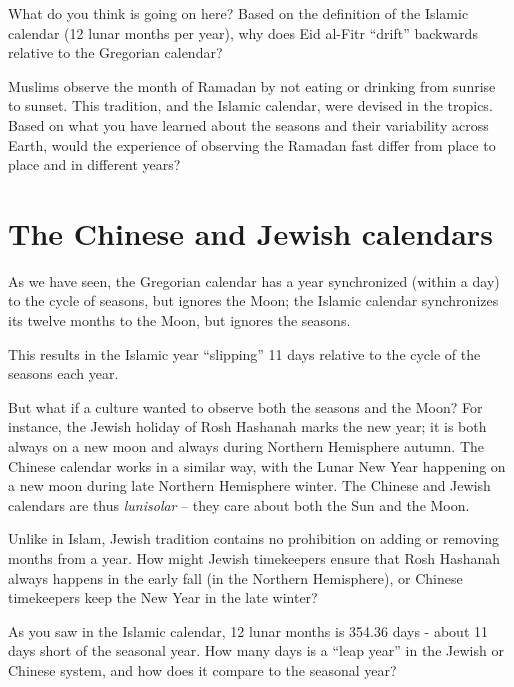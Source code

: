 \documentclass[11pt]{article}
\begin{document}
What do you think is going on here? Based on the definition of the Islamic calendar (12 lunar months per year), why does Eid al-Fitr ``drift'' backwards relative to the Gregorian calendar?

\vspace{2in}
\underline{\hspace{6in}}

Muslims observe the month of Ramadan by not eating or drinking from sunrise to sunset. This tradition, and the Islamic calendar, were devised in the tropics. Based on what you have learned about the seasons and their variability across Earth, would the experience of observing the Ramadan fast differ from place to place and in different years?


\vspace{2in}
\underline{\hspace{6in}}

\section{The Chinese and Jewish calendars}

As we have seen, the Gregorian calendar has a year synchronized (within a day) to the cycle of seasons, but ignores the Moon; the Islamic calendar synchronizes its twelve months to the Moon, but ignores the seasons. 

This results in the Islamic year ``slipping'' 11 days relative to the cycle of the seasons each year.

But what if a culture wanted to observe both the seasons and the Moon? For instance, the Jewish holiday of Rosh Hashanah marks the new year; it is both always on a new moon and always during Northern Hemisphere autumn. The Chinese calendar works in a similar way, with the Lunar New Year happening on a new moon during late Northern Hemisphere winter. The Chinese and Jewish calendars are thus {\it lunisolar} -- they care about both the Sun and the Moon.

Unlike in Islam, Jewish tradition contains no prohibition on adding or removing months from a year. How might Jewish timekeepers ensure that Rosh Hashanah always happens in the early fall (in the Northern Hemisphere), or Chinese timekeepers keep the New Year in the late winter?

\vspace{2in}
\underline{\hspace{6in}}

As you saw in the Islamic calendar, 12 lunar months is 354.36 days - about 11 days short of the seasonal year. How many days is a ``leap year'' in the Jewish or Chinese system, and how does it compare to the seasonal year?
\end{document}
